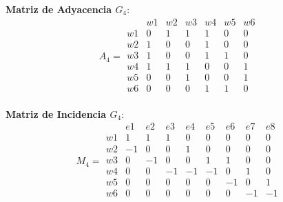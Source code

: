 \documentclass{article}
\begin{document}
\textbf{Matriz de Adyacencia \( G_4 \)}:
\[
A_4 =
\begin{array}{c|cccccc}
    & w1 & w2 & w3 & w4 & w5 & w6 \\
\hline
w1 & 0 & 1 & 1 & 1 & 0 & 0 \\
w2 & 1 & 0 & 0 & 1 & 0 & 0 \\
w3 & 1 & 0 & 0 & 1 & 1 & 0 \\
w4 & 1 & 1 & 1 & 0 & 0 & 1 \\
w5 & 0 & 0 & 1 & 0 & 0 & 1 \\
w6 & 0 & 0 & 0 & 1 & 1 & 0 \\
\end{array}
\]



\textbf{Matriz de Incidencia \( G_4 \)}:
\[
M_4 =
\begin{array}{c|cccccccc}
    & e1 & e2 & e3 & e4 & e5 & e6 & e7 & e8 \\
\hline
w1 & 1  & 1  & 1  & 0  & 0  & 0  & 0  & 0  \\
w2 & -1 & 0  & 0  & 1  & 0  & 0  & 0  & 0  \\
w3 & 0  & -1 & 0  & 0  & 1  & 1  & 0  & 0  \\
w4 & 0  & 0  & -1 & -1 & -1 & 0  & 1  & 0  \\
w5 & 0  & 0  & 0  & 0  & 0  & -1 & 0  & 1  \\
w6 & 0  & 0  & 0  & 0  & 0  & 0  & -1 & -1 \\
\end{array}
\]
\end{document}
